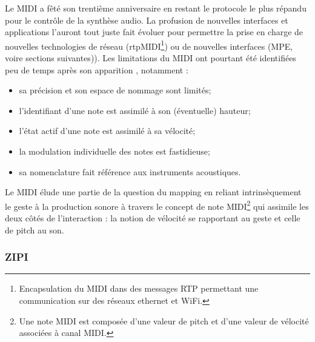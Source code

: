 \noindent Le \gls{MIDI} a fêté son trentième anniversaire en restant le protocole le plus répandu pour le contrôle de la synthèse audio. La profusion de nouvelles interfaces et applications l'auront tout juste fait évoluer pour permettre la prise en charge de nouvelles technologies de réseau (rtpMIDI\footnote{ Encapsulation du \gls{MIDI} dans des messages \gls{RTP} permettant une communication sur des réseaux ethernet et WiFi.}) ou de nouvelles interfaces (\gls{MPE}, voire sections suivantes)).
Les limitations du \gls{MIDI} ont pourtant été identifiées peu de temps après son apparition \cite{mcmillen_zipi_1994}\cite{moore_dysfunctions_1988}\cite{selfridge-field_beyond_1997}, notamment :
\vspace{-1em}
\begin{itemize}[noitemsep]
	\item sa précision et son espace de nommage sont limités;
	\item l'identifiant d'une note est assimilé à son (éventuelle) hauteur;
	\item l'état actif d'une note est assimilé à sa vélocité;
	\item la modulation individuelle des notes est fastidieuse;
	\item sa nomenclature fait référence aux instruments acoustiques.
\end{itemize}

\noindent Le \gls{MIDI} élude une partie de la question du mapping en reliant intrinsèquement le geste à la production sonore à travers le concept de note \gls{MIDI}\footnote{ Une note \gls{MIDI} est composée d'une valeur de pitch et d'une valeur de vélocité associées à canal \gls{MIDI}.} qui assimile les deux côtés de l'interaction : la notion de vélocité se rapportant au geste et celle de pitch au son.

\subsubsection{ZIPI}

